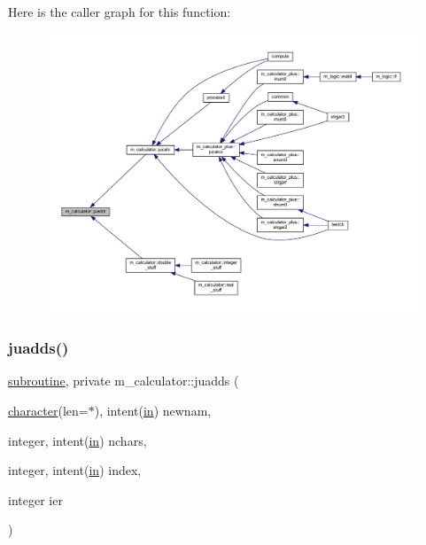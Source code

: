 Here is the caller graph for this function\+:
\nopagebreak
\begin{figure}[H]
\begin{center}
\leavevmode
\includegraphics[width=350pt]{namespacem__calculator_a9306409f00c5ba6200bb68ca672b6053_icgraph}
\end{center}
\end{figure}
\mbox{\label{namespacem__calculator_a6d54137f485f8d2ed239b58e44cdb732}} 
\subsubsection{\texorpdfstring{juadds()}{juadds()}}
{\footnotesize\ttfamily \hyperlink{M__stopwatch_83_8txt_acfbcff50169d691ff02d4a123ed70482}{subroutine}, private m\+\_\+calculator\+::juadds (\begin{DoxyParamCaption}\item[{\hyperlink{option__stopwatch_83_8txt_abd4b21fbbd175834027b5224bfe97e66}{character}(len=$\ast$), intent(\hyperlink{M__journal_83_8txt_afce72651d1eed785a2132bee863b2f38}{in})}]{newnam,  }\item[{integer, intent(\hyperlink{M__journal_83_8txt_afce72651d1eed785a2132bee863b2f38}{in})}]{nchars,  }\item[{integer, intent(\hyperlink{M__journal_83_8txt_afce72651d1eed785a2132bee863b2f38}{in})}]{index,  }\item[{integer}]{ier }\end{DoxyParamCaption})\hspace{0.3cm}{\ttfamily [private]}}



